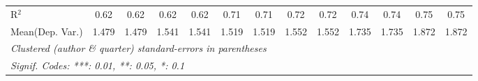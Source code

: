 \begin{tabular}{lcccccccccccc}
   R$^2$                                    & 0.62           & 0.62     & 0.62          & 0.62     & 0.71        & 0.71         & 0.72    & 0.72    & 0.74    & 0.74          & 0.75         & 0.75\\  
Mean(Dep. Var.) & 1.479 & 1.479 & 1.541 & 1.541 & 1.519 & 1.519 & 1.552 & 1.552 & 1.735 & 1.735 & 1.872 & 1.872 \\
   \midrule \midrule
   \multicolumn{13}{l}{\emph{Clustered (author \& quarter) standard-errors in parentheses}}\\
   \multicolumn{13}{l}{\emph{Signif. Codes: ***: 0.01, **: 0.05, *: 0.1}}\\
\end{tabular}
\par\endgroup
